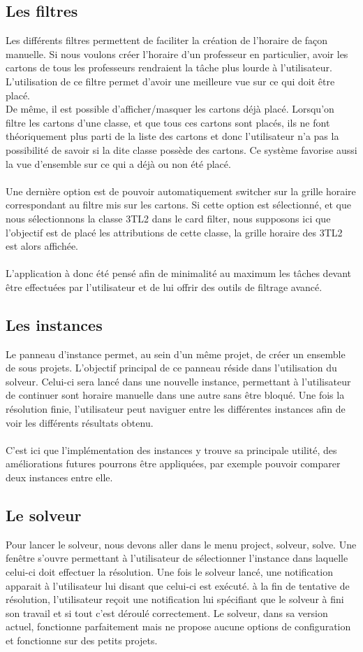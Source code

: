 \subsection{Les filtres}
Les différents filtres permettent de faciliter la création de l'horaire de façon manuelle. Si nous voulons créer l'horaire d'un professeur en particulier, avoir les cartons de tous les professeurs rendraient la tâche plus lourde à l'utilisateur. L'utilisation de ce filtre permet d'avoir une meilleure vue sur ce qui doit être placé.\\
De même, il est possible d'afficher/masquer les cartons déjà placé. Lorsqu'on filtre les cartons d'une classe, et que tous ces cartons sont placés, ils ne font théoriquement plus parti de la liste des cartons et donc l'utilisateur n'a pas la possibilité de savoir si la dite classe possède des cartons. Ce système favorise aussi la vue d'ensemble sur ce qui a déjà ou non été placé.\\
\\
Une dernière option est de pouvoir automatiquement switcher sur la grille horaire correspondant au filtre mis sur les cartons. Si cette option est sélectionné, et que nous sélectionnons la classe 3TL2 dans le card filter, nous supposons ici que l'objectif est de placé les attributions de cette classe, la grille horaire des 3TL2 est alors affichée.\\
\\
L'application à donc été pensé afin de minimalité au maximum les tâches devant être effectuées par l'utilisateur et de lui offrir des outils de filtrage avancé.
\subsection{Les instances}
Le panneau d'instance permet, au sein d'un même projet, de créer un ensemble de sous projets. L'objectif principal de ce panneau réside dans l'utilisation du solveur. Celui-ci sera lancé dans une nouvelle instance, permettant à l'utilisateur de continuer sont horaire manuelle dans une autre sans être bloqué. Une fois la résolution finie, l'utilisateur peut naviguer entre les différentes instances afin de voir les différents résultats obtenu. \\
\\
C'est ici que l'implémentation des instances y trouve sa principale utilité, des améliorations futures pourrons être appliquées, par exemple pouvoir comparer deux instances entre elle.
\subsection{Le solveur}
Pour lancer le solveur, nous devons aller dans le menu project, solveur, solve. Une fenêtre s'ouvre permettant à l'utilisateur de sélectionner l'instance dans laquelle celui-ci doit effectuer la résolution. Une fois le solveur lancé, une notification apparait à l'utilisateur lui disant que celui-ci est exécuté. à la fin de tentative de résolution, l'utilisateur reçoit une notification lui spécifiant que le solveur à fini son travail et si tout c'est déroulé correctement. Le solveur, dans sa version actuel, fonctionne parfaitement mais ne propose aucune options de configuration et fonctionne sur des petits projets. 
